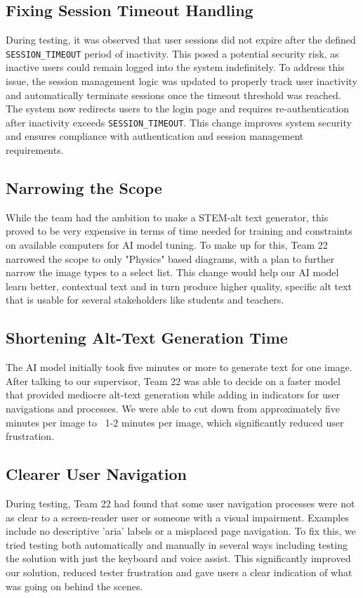\documentclass[12pt, titlepage]{article}
\begin{document}
\subsection{Fixing Session Timeout Handling}
During testing, it was observed that user sessions did not expire
after the defined \texttt{SESSION\_TIMEOUT} period of inactivity.
This posed a potential security risk, as inactive users could remain
logged into the system indefinitely. To address this issue, the
session management logic was updated to properly track user
inactivity and automatically terminate sessions once the timeout
threshold was reached. The system now redirects users to the login
page and requires re-authentication after inactivity exceeds
\texttt{SESSION\_TIMEOUT}. This change improves system security and
ensures compliance with authentication and session management requirements.

\subsection{Narrowing the Scope}
While the team had the ambition to make a STEM-alt text generator,
this proved to be very expensive in terms of time needed for training
and constraints on available computers for AI model tuning. To make
up for this, Team 22 narrowed the scope to only "Physics" based
diagrams, with a plan to further narrow the image types to a select
list. This change would help our AI model learn better, contextual
text and in turn produce higher quality, specific alt text that is
usable for several stakeholders like students and teachers.\\

\subsection{Shortening Alt-Text Generation Time}
The AI model initially took five minutes or more to generate text for
one image. After talking to our supervisor, Team 22 was able to
decide on a faster model that provided mediocre alt-text generation
while adding in indicators for user navigations and processes. We
were able to cut down from approximately five minutes per image to
~1-2 minutes per image, which significantly reduced user frustration. \\

\subsection{Clearer User Navigation}
During testing, Team 22 had found that some user navigation processes
were not as clear to a screen-reader user or someone with a visual
impairment. Examples include no descriptive 'aria' labels or a
misplaced page navigation. To fix this, we tried testing both
automatically and manually in several ways including testing the
solution with just the keyboard and voice assist. This significantly
improved our solution, reduced tester frustration and gave users a
clear indication of what was going on behind the scenes. \\
\end{document}
